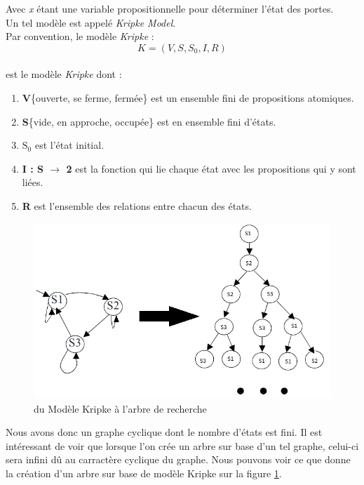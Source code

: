 \documentclass[runningheads,a4paper]{llncs}
\begin{document}
\noindent Avec \textit{x} étant une variable propositionnelle pour déterminer l'état des portes.\\
Un tel modèle est appelé \textit{Kripke Model}.\\
Par convention, le modèle \textit{Kripke} : $$K = (V, S, S_{0}, I, R)$$ \\
est le modèle \textit{Kripke} dont :
\begin{enumerate}
\item \textbf{V}\{ouverte, se ferme, fermée\} est un ensemble fini de propositions atomiques.
\item \textbf{S}\{vide, en approche, occupée\} est en ensemble fini d'états.
\item \textbf{$\textrm{S}_\textrm{0}$} est l'état initial.
\item \textbf{I : S $\rightarrow$ 2} est la fonction qui lie chaque état avec les propositions qui y sont liées.
\item \textbf{R} est l'ensemble des relations entre chacun des états.
\end{enumerate}

\begin{figure}[!h]
	\includegraphics[scale=0.4]{kripke.png}
	\centering
	\caption{du Modèle Kripke à l'arbre de recherche}
	\label{label-image4}
\end{figure}

\noindent Nous avons donc un graphe cyclique dont le nombre d'états est fini. Il est intéressant de voir que lorsque l'on crée un arbre sur base d'un tel graphe, celui-ci sera infini dû au carractère cyclique du graphe. Nous pouvons voir ce que donne la création d'un arbre sur base de modèle Kripke sur la figure \ref{label-image4}.
\end{document}
